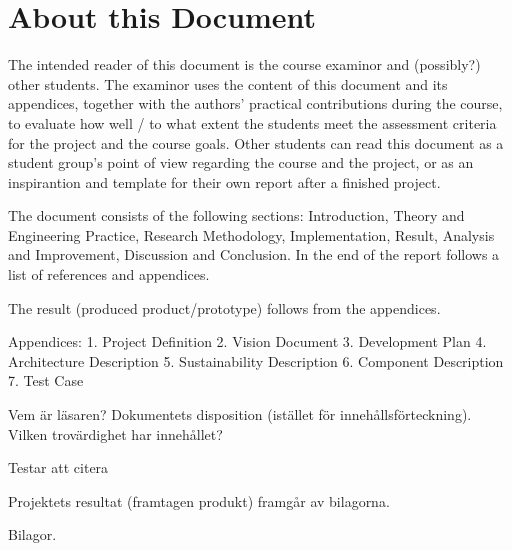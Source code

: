 \section{About this Document}
The intended reader of this document is the course examinor and (possibly?) other students. The examinor uses the content of this document and its appendices, together with the authors' practical contributions during the course, to evaluate how well / to what extent the students meet the assessment criteria for the project and the course goals. Other students can read this document as a student group's point of view regarding the course and the project, or as an inspirantion and template for their own report after a finished project. 

The document consists of the following sections: Introduction, Theory and Engineering Practice, Research Methodology, Implementation, Result, Analysis and Improvement, Discussion and Conclusion. In the end of the report follows a list of references and appendices. 

The result (produced product/prototype) follows from the appendices. 

Appendices: 
1. Project Definition 
2. Vision Document 
3. Development Plan
4. Architecture Description
5. Sustainability Description 
6. Component Description 
7. Test Case 



Vem är läsaren? Dokumentets disposition (istället för innehållsförteckning). Vilken trovärdighet har innehållet?

Testar att citera \cite{eklund_arbeta_2010}

Projektets resultat (framtagen produkt) framgår av bilagorna.

Bilagor.
